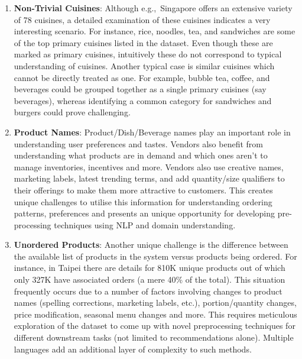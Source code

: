 \documentclass[manuscript]{acmart}
\newcommand{\eg}{e.g.,~}
\begin{document}
\begin{enumerate}
\item \textbf{Non-Trivial Cuisines}: Although \eg Singapore offers an
extensive variety of 78 cuisines, a detailed examination of these
cuisines indicates a very interesting scenario. For instance, rice,
noodles, tea, and sandwiches are some of the top primary cuisines listed
in the dataset. Even though these are marked as primary cuisines,
intuitively these do not correspond to typical understanding of cuisines.
Another typical case is similar cuisines which cannot be
directly treated as one. For example, bubble tea, coffee, and beverages
could be grouped together as a single primary cuisines (say beverages),
whereas identifying a common category for sandwiches and burgers could
prove challenging. 

\item \textbf{Product Names}: Product/Dish/Beverage names play an important role
in understanding user preferences and tastes. Vendors also benefit from
understanding what products are in demand and which ones aren’t to manage
inventories, incentives and more. Vendors also use creative names,
marketing labels, latest trending terms, and add quantity/size qualifiers
to their offerings to make them more attractive to customers. This
creates unique challenges to utilise this information for understanding
ordering patterns, preferences and  presents an unique opportunity for
developing pre-processing techniques using NLP and domain understanding.

\item \textbf{Unordered Products}: Another unique challenge is the difference
between the available list of products in the system versus products
being ordered. For instance, in Taipei there are details for 810K
unique products out of which only 327K have associated orders (a mere
40\% of the total). This situation frequently occurs due to
a number of factors involving changes to product names (spelling
corrections, marketing labels, etc.), portion/quantity changes, price
modification, seasonal menu changes and more. This requires meticulous
exploration of the dataset to come up with novel preprocessing techniques
for different downstream tasks (not limited to recommendations alone).
Multiple languages add an additional layer of complexity to such methods.
\end{enumerate}
\end{document}
